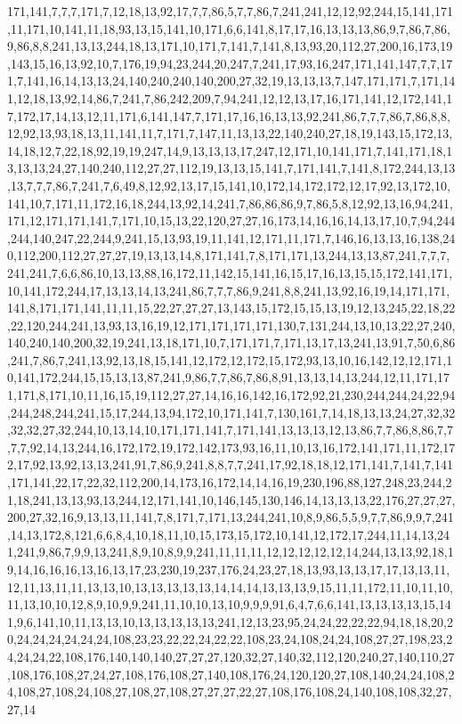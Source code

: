 171,141,7,7,7,171,7,12,18,13,92,17,7,7,86,5,7,7,86,7,241,241,12,12,92,244,15,141,171,11,171,10,141,11,18,93,13,15,141,10,171,6,6,141,8,17,17,16,13,13,13,86,9,7,86,7,86,9,86,8,8,241,13,13,244,18,13,171,10,171,7,141,7,141,8,13,93,20,112,27,200,16,173,19,143,15,16,13,92,10,7,176,19,94,23,244,20,247,7,241,17,93,16,247,171,141,147,7,7,171,7,141,16,14,13,13,24,140,240,240,140,200,27,32,19,13,13,13,7,147,171,171,7,171,141,12,18,13,92,14,86,7,241,7,86,242,209,7,94,241,12,12,13,17,16,171,141,12,172,141,17,172,17,14,13,12,11,171,6,141,147,7,171,17,16,16,13,13,92,241,86,7,7,7,86,7,86,8,8,12,92,13,93,18,13,11,141,11,7,171,7,147,11,13,13,22,140,240,27,18,19,143,15,172,13,14,18,12,7,22,18,92,19,19,247,14,9,13,13,13,17,247,12,171,10,141,171,7,141,171,18,13,13,13,24,27,140,240,112,27,27,112,19,13,13,15,141,7,171,141,7,141,8,172,244,13,13,13,7,7,7,86,7,241,7,6,49,8,12,92,13,17,15,141,10,172,14,172,172,12,17,92,13,172,10,141,10,7,171,11,172,16,18,244,13,92,14,241,7,86,86,86,9,7,86,5,8,12,92,13,16,94,241,171,12,171,171,141,7,171,10,15,13,22,120,27,27,16,173,14,16,16,14,13,17,10,7,94,244,244,140,247,22,244,9,241,15,13,93,19,11,141,12,171,11,171,7,146,16,13,13,16,138,240,112,200,112,27,27,27,19,13,13,14,8,171,141,7,8,171,171,13,244,13,13,87,241,7,7,7,241,241,7,6,6,86,10,13,13,88,16,172,11,142,15,141,16,15,17,16,13,15,15,172,141,171,10,141,172,244,17,13,13,14,13,241,86,7,7,7,86,9,241,8,8,241,13,92,16,19,14,171,171,141,8,171,171,141,11,11,15,22,27,27,27,13,143,15,172,15,15,13,19,12,13,245,22,18,22,22,120,244,241,13,93,13,16,19,12,171,171,171,171,130,7,131,244,13,10,13,22,27,240,140,240,140,200,32,19,241,13,18,171,10,7,171,171,7,171,13,17,13,241,13,91,7,50,6,86,241,7,86,7,241,13,92,13,18,15,141,12,172,12,172,15,172,93,13,10,16,142,12,12,171,10,141,172,244,15,15,13,13,87,241,9,86,7,7,86,7,86,8,91,13,13,14,13,244,12,11,171,171,171,8,171,10,11,16,15,19,112,27,27,14,16,16,142,16,172,92,21,230,244,244,24,22,94,244,248,244,241,15,17,244,13,94,172,10,171,141,7,130,161,7,14,18,13,13,24,27,32,32,32,32,27,32,244,10,13,14,10,171,171,141,7,171,141,13,13,13,12,13,86,7,7,86,8,86,7,7,7,7,92,14,13,244,16,172,172,19,172,142,173,93,16,11,10,13,16,172,141,171,11,172,172,17,92,13,92,13,13,241,91,7,86,9,241,8,8,7,7,241,17,92,18,18,12,171,141,7,141,7,141,171,141,22,17,22,32,112,200,14,173,16,172,14,14,16,19,230,196,88,127,248,23,244,21,18,241,13,13,93,13,244,12,171,141,10,146,145,130,146,14,13,13,13,22,176,27,27,27,200,27,32,16,9,13,13,11,141,7,8,171,7,171,13,244,241,10,8,9,86,5,5,9,7,7,86,9,9,7,241,14,13,172,8,121,6,6,8,4,10,18,11,10,15,173,15,172,10,141,12,172,17,244,11,14,13,241,241,9,86,7,9,9,13,241,8,9,10,8,9,9,241,11,11,11,12,12,12,12,12,14,244,13,13,92,18,19,14,16,16,16,13,16,13,17,23,230,19,237,176,24,23,27,18,13,93,13,13,17,17,13,13,11,12,11,13,11,11,13,13,10,13,13,13,13,13,14,14,14,13,13,13,9,15,11,11,172,11,10,11,10,11,13,10,10,12,8,9,10,9,9,241,11,10,10,13,10,9,9,9,91,6,4,7,6,6,141,13,13,13,13,15,141,9,6,141,10,11,13,13,10,13,13,13,13,13,241,12,13,23,95,24,24,22,22,22,94,18,18,20,20,24,24,24,24,24,24,108,23,23,22,22,24,22,22,108,23,24,108,24,24,108,27,27,198,23,24,24,24,22,108,176,140,140,140,27,27,27,120,32,27,140,32,112,120,240,27,140,110,27,108,176,108,27,24,27,108,176,108,27,140,108,176,24,120,120,27,108,140,24,24,108,24,108,27,108,24,108,27,108,27,108,27,27,27,22,27,108,176,108,24,140,108,108,32,27,27,14